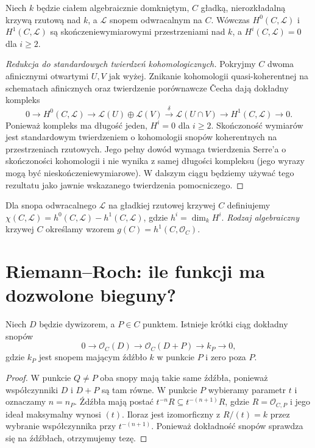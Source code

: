 \begin{twierdzenie}
\label{tw:curve-coh}
Niech $k$ będzie ciałem algebraicznie domkniętym,
$C$ gładką, nierozkładalną krzywą rzutową nad $k$,
a $\mathcal L$ snopem odwracalnym na $C$.
Wówczas $H^0(C,\mathcal L)$ i $H^1(C,\mathcal L)$ są
skończeniewymiarowymi przestrzeniami nad $k$,
a $H^i(C,\mathcal L)=0$ dla $i\ge2$.
\end{twierdzenie}
\begin{proof}[Redukcja do standardowych twierdzeń kohomologicznych]
Pokryjmy $C$ dwoma afinicznymi otwartymi $U,V$
jak wyżej. Znikanie kohomologii quasi-koherentnej
na schematach afinicznych oraz twierdzenie
porównawcze Čecha dają dokładny kompleks
\[
 0\longrightarrow H^0(C,\mathcal L)
 \longrightarrow\mathcal L(U)\oplus\mathcal L(V)
 \xrightarrow{\delta}\mathcal L(U\cap V)
 \longrightarrow H^1(C,\mathcal L)\longrightarrow0.
\]
Ponieważ kompleks ma długość jeden,
$H^i=0$ dla $i\ge2$.
Skończoność wymiarów jest standardowym
twierdzeniem o kohomologii snopów koherentnych
na przestrzeniach rzutowych. Jego pełny dowód
wymaga twierdzenia Serre'a o skończoności
kohomologii i nie wynika z samej długości
kompleksu (jego wyrazy mogą być nieskończeniewymiarowe).
W dalszym ciągu będziemy używać tego rezultatu
jako jawnie wskazanego twierdzenia pomocniczego.
\end{proof}

\begin{definicja}
Dla snopa odwracalnego $\mathcal L$ na gładkiej
rzutowej krzywej $C$ definiujemy
$\chi(C,\mathcal L)=h^0(C,\mathcal L)-h^1(C,\mathcal L)$,
gdzie $h^i=\dim_kH^i$. \emph{Rodzaj algebraiczny}
krzywej $C$ określamy wzorem
$g(C)=h^1(C,\mathcal O_C)$.
\end{definicja}

\section{Riemann--Roch: ile funkcji ma dozwolone bieguny?}
\label{sec:rr}

\begin{lemat}
\label{lem:exact-point}
Niech $D$ będzie dywizorem, a $P\in C$ punktem.
Istnieje krótki ciąg dokładny snopów
\[
 0\longrightarrow\mathcal O_C(D)
 \longrightarrow\mathcal O_C(D+P)
 \longrightarrow k_P\longrightarrow0,
\]
gdzie $k_P$ jest snopem mającym źdźbło $k$
w punkcie $P$ i zero poza $P$.
\end{lemat}
\begin{proof}
W punkcie $Q\ne P$ oba snopy mają takie same
źdźbła, ponieważ współczynniki $D$ i $D+P$
są tam równe. W punkcie $P$ wybieramy parametr
$t$ i oznaczamy $n=n_P$. Źdźbła mają postać
$t^{-n}R\subseteq t^{-(n+1)}R$, gdzie
$R=\mathcal O_{C,P}$ i jego ideał maksymalny
wynosi $(t)$. Iloraz jest izomorficzny z
$R/(t)=k$ przez wybranie współczynnika przy
$t^{-(n+1)}$. Ponieważ dokładność snopów
sprawdza się na źdźbłach, otrzymujemy tezę.
\end{proof}

